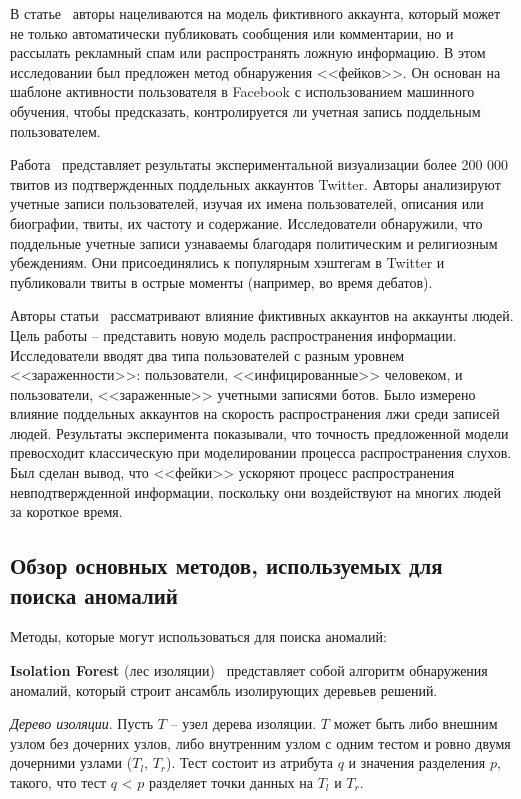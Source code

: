 В статье~\cite{ChenW18} авторы нацеливаются на модель фиктивного аккаунта, который может не только автоматически публиковать сообщения или комментарии, но и рассылать рекламный спам или распространять ложную информацию. В этом исследовании был предложен метод обнаружения <<фейков>>. Он основан на шаблоне активности пользователя в Facebook с использованием машинного обучения, чтобы предсказать, контролируется ли учетная запись поддельным пользователем.

Работа~\cite{HsuKJ19} представляет результаты экспериментальной визуализации более 200 000 твитов из подтвержденных поддельных аккаунтов Twitter. Авторы анализируют учетные записи пользователей, изучая их имена пользователей, описания или биографии, твиты, их частоту и содержание. Исследователи обнаружили, что поддельные учетные записи узнаваемы благодаря политическим и религиозным убеждениям. Они присоединялись к популярным хэштегам в Twitter и публиковали твиты в острые моменты (например, во время дебатов).

Авторы статьи~\cite{FahmyAKE23} рассматривают влияние фиктивных аккаунтов на аккаунты людей. Цель работы -- представить новую модель распространения информации. Исследователи вводят два типа пользователей с разным уровнем <<зараженности>>: пользователи, <<инфицированные>> человеком, и пользователи, <<зараженные>> учетными записями ботов. Было измерено влияние поддельных аккаунтов на скорость распространения лжи среди записей людей. Результаты эксперимента показывали, что точность предложенной модели превосходит классическую при моделировании процесса распространения слухов. Был сделан вывод, что <<фейки>> ускоряют процесс распространения невподтвержденной информации, поскольку они воздействуют на многих людей за короткое время.

\vspace{1.5em}
\subsection{Обзор основных методов, используемых для поиска аномалий}
\label{subsec:Variants}
Методы, которые могут использоваться для поиска аномалий:

\textbf{Isolation Forest} (лес изоляции)~\cite{LiuTZ08} представляет собой алгоритм обнаружения аномалий, который строит ансамбль изолирующих деревьев решений. 

\textit{Дерево изоляции}. Пусть $T$ -- узел дерева изоляции. $T$ может быть либо внешним узлом без дочерних узлов, либо внутренним узлом с одним тестом и ровно двумя дочерними узлами ($T_l$, $T_r$). Тест состоит из атрибута $q$ и значения разделения $p$, такого, что тест $q$ < $p$ разделяет точки данных на $T_l$ и $T_r$. 

